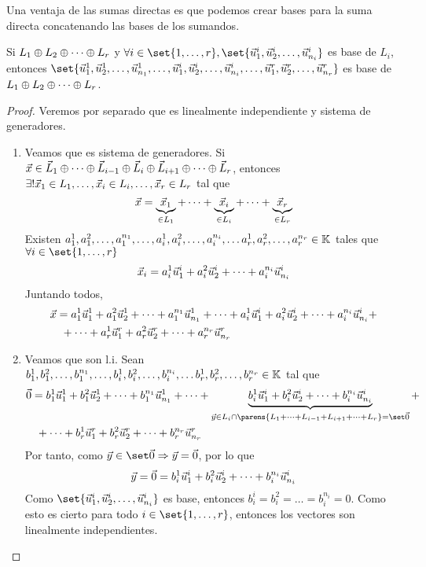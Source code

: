 \documentclass[../algebra_lineal.tex]{subfiles}
\begin{document}
Una ventaja de las sumas directas es que podemos crear bases para la suma directa concatenando las bases de los sumandos.

\begin{proposition}
    Si $\pdlst{L}{r}{\oplus}$ y $\forall i \in \set{1, \dots, r}, \set{\vlstp{u}{n_i}{i}}$ es base de $L_i$, entonces $\set{\vlstp{u}{n_1}{1}, \dots, \vlstp{u}{n_i}{i}, \dots, \vlstp{u}{n_r}{r}}$ es base de $\pdlst{L}{r}{\oplus}$.
\end{proposition}

\begin{proof}
    Veremos por separado que es linealmente independiente y sistema de generadores.
    \begin{enumerate}
        \item Veamos que es sistema de generadores. Si $\vx \in \pcvlst{L}{r}{i}{\oplus}$, entonces $\exists ! \vx_1 \in L_1, \dots, \vx_i \in L_i, \dots, \vx_r \in L_r $ tal que
        \[
            \vx = \underbrace{\vx_1}_{\in L_1} + \dots + \underbrace{\vx_i}_{\in L_i} + \dots +  \underbrace{\vx_r}_{\in L_r}
        \]
        Existen $\slstp{a}{n_1}{1}, \dots, \slstp{a}{n_i}{i}, \dots \slstp{a}{n_r}{r} \in \K$ tales que $\forall i \in \set {1, \dots, r}$
        \[
            \vx_i = \lincombp{a}{u}{n_i}{i}
        \]
        Juntando todos,
        \begin{align*}
            \vx &= \lincombp{a}{u}{n_1}{1} + \dots + \lincombp{a}{u}{n_i}{i} + \\
             & \spc + \dots + \lincombp{a}{u}{n_r}{r}
        \end{align*}
        \item Veamos que son l.i. Sean $\slstp{b}{n_1}{1}, \dots, \slstp{b}{n_i}{i}, \dots \slstp{b}{n_r}{r} \in \K$ tal que
        \begin{align*}
            \zv &= \lincombp{b}{u}{n_1}{1} + \dots + \underbrace{\lincombp{b}{u}{n_i}{i}}_{\vy \in L_i \cap \parens{\pidlst{L}{r}{i}{+}} = \zvs } + \\
            & \spc + \dots + \lincombp{b}{u}{n_r}{r}
        \end{align*}
        Por tanto, como $\vy \in \zvs \Rightarrow \vy = \zv$, por lo que
        \[
            \vy = \zv = \lincombp{b}{u}{n_i}{i} 
        \]
        Como $\set{\vlstp{u}{n_i}{i}}$ es base, entonces $b_i^i=b_i^2= \dots = b_i^{n_i} = 0$. Como esto es cierto para todo $i \in \set{1, \dots, r}$, entonces los vectores son linealmente independientes. 
    \end{enumerate}
\end{proof}
\end{document}

